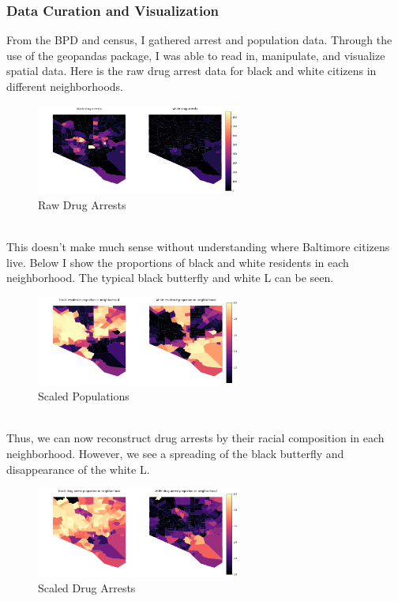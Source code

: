 \documentclass[10pt]{article}
\begin{document}
\subsubsection{Data Curation and Visualization}
From the BPD and census, I gathered arrest and population data. Through the use of the geopandas package, I was able to read in, manipulate, and visualize spatial data. Here is the raw drug arrest data for black and white citizens in different neighborhoods.   \begin{figure}[!htb]
    \begin{minipage}{\textwidth}
     \caption{Raw Drug Arrests}
     \centering
     \includegraphics[width=0.6\textwidth]{rawdrug.png}
   \end{minipage}\hfill
 \end{figure}\\
 This doesn't make much sense without understanding where Baltimore citizens live. Below I show the proportions of black and white residents in each neighborhood. The typical black butterfly and white L can be seen.
   \begin{figure}[!htb]
    \begin{minipage}{\textwidth}
     \caption{Scaled Populations}
     \centering
     \includegraphics[width=0.6\textwidth]{scalelive.png}
   \end{minipage}\hfill
 \end{figure}\\
 Thus, we can now reconstruct drug arrests by their racial composition in each neighborhood. However, we see a spreading of the black butterfly and disappearance of the white L. 
    \begin{figure}[!htb]
    \begin{minipage}{\textwidth}
     \caption{Scaled Drug Arrests}
     \centering
     \includegraphics[width=0.6\textwidth]{scaledrug.png}
   \end{minipage}\hfill
 \end{figure}\\
\end{document}
